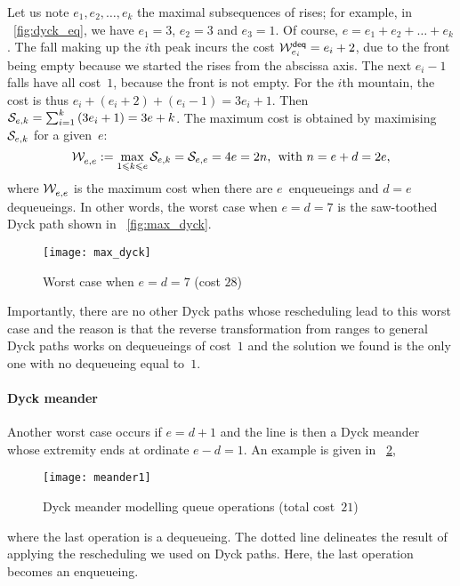 Let us note \(e_1, e_2, \dots, e_k\) the maximal subsequences of
rises; for example, in \fig~\ref{fig:dyck_eq}, we have \(e_1=3\),
\(e_2 = 3\) and \(e_3 = 1\). Of course, \(e = e_1 + e_2 + \dots +
e_k\). The fall making up the \(i\)th peak incurs the
cost \(\W{\fun{deq}}{e_i} = e_i + 2\),
due to the front being empty because we started the rises from the
abscissa axis. The next \(e_i-1\) falls have all cost~\(1\), because
the front is not empty. For the \(i\)th mountain, the cost is thus
\(e_i+(e_i+2)+(e_i-1) = 3e_i+1\). Then \(\A{e,k} =
\sum_{i=1}^{k}{(3e_i+1)} = 3e + k\). The maximum cost is obtained by
maximising \(\A{e,k}\) for a given~\(e\):
\begin{equation*}
\W{}{e,e} := \max_{1 \leqslant k \leqslant e}{\A{e,k}} = \A{e,e} = 4e
= 2n,\,\; \text{with \(n=e+d=2e\)},
\end{equation*}
where \(\W{}{e,e}\) is the maximum cost when there are
\(e\)~enqueueings and \({d=e}\) dequeueings. In other words, the worst
case when \(e=d=7\) is the saw\hyp{}toothed Dyck path shown in
\fig~\vref{fig:max_dyck}.
\begin{figure}
\centering
\texttt{[image: max\_dyck]}
\caption{Worst case when \(e=d=7\) (cost \(28\))
\label{fig:max_dyck}}
\end{figure}
Importantly, there are no other Dyck paths whose rescheduling lead to
this worst case and the reason is that the reverse transformation from
ranges to general Dyck paths works on dequeueings of cost~\(1\) and
the solution we found is the only one with no dequeueing equal
to~\(1\).

\paragraph{Dyck meander}

Another worst case occurs if \(e = d + 1\) and the line is then a Dyck
meander whose extremity ends at ordinate \(e-d=1\). An example is
given in \fig~\ref{fig:meander1},
\begin{figure}[t]
\centering
\texttt{[image: meander1]}
\caption{Dyck meander modelling queue operations (total cost~\(21\))\label{fig:meander1}}
\end{figure}
where the last operation is a dequeueing. The dotted line delineates
the result of applying the rescheduling we used on Dyck paths. Here,
the last operation becomes an enqueueing.

